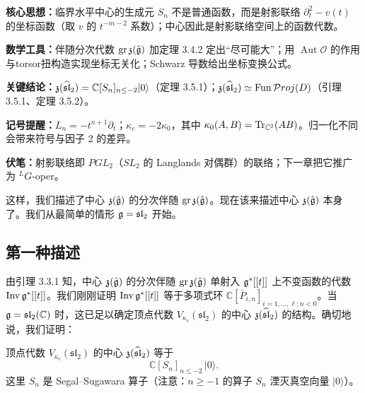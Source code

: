 \begin{keypoints}
    \item \textbf{核心思想：}临界水平中心的生成元 $S_n$ 不是普通函数，而是射影联络 $\partial_t^2-v(t)$ 的坐标函数（取 $v$ 的 $t^{-m-2}$ 系数）；中心因此是射影联络空间上的函数代数。
    \item \textbf{数学工具：}伴随分次代数 $\operatorname{gr}\mathfrak{z}(\hat{\mathfrak{g}})$ 加定理 3.4.2 定出“尽可能大”；用 $\operatorname{Aut}\mathcal{O}$ 的作用与torsor扭构造实现坐标无关化；Schwarz 导数给出坐标变换公式。
    \item \textbf{关键结论：}$\mathfrak{z}(\widehat{\mathfrak{sl}}_2)=\mathbb{C}[S_n]_{n\le-2}|0\rangle$（定理 3.5.1）；$\mathfrak{z}(\widehat{\mathfrak{sl}}_2)\simeq\operatorname{Fun}\mathcal{P}roj(D)$（引理 3.5.1、定理 3.5.2）。
    \item \textbf{记号提醒：}$L_n=-t^{n+1}\partial_t$；$\kappa_c=-2\kappa_0$，其中 $\kappa_0(A,B)=\operatorname{Tr}_{\mathbb{C}^2}(AB)$。归一化不同会带来符号与因子 2 的差异。
    \item \textbf{伏笔：}射影联络即 $PGL_2$（$SL_2$ 的 Langlands 对偶群）的联络；下一章把它推广为 $^LG$-oper。
\end{keypoints}

这样，我们描述了中心 $\mathfrak{z}(\hat{\mathfrak{g}})$ 的分次伴随 $\operatorname{gr}\mathfrak{z}(\hat{\mathfrak{g}})$。现在该来描述中心 $\mathfrak{z}(\hat{\mathfrak{g}})$ 本身了。我们从最简单的情形 $\mathfrak{g}=\mathfrak{sl}_2$ 开始。

\subsection{第一种描述}

由引理 3.3.1 知，中心 $\mathfrak{z}(\hat{\mathfrak{g}})$ 的分次伴随 $\operatorname{gr}\mathfrak{z}(\hat{\mathfrak{g}})$ 单射入 $\mathfrak{g}^*[[t]]$ 上不变函数的代数 $\operatorname{Inv}\mathfrak{g}^*[[t]]$。我们刚刚证明 $\operatorname{Inv}\mathfrak{g}^*[[t]]$ 等于多项式环 $\mathbb{C}[\bar P_{i,n}]_{i=1,\dots,\ell;n<0}$。当 $\mathfrak{g}=\mathfrak{sl}_2(\mathbb{C})$ 时，这已足以确定顶点代数 $V_{\kappa_c}(\mathfrak{sl}_2)$ 的中心 $\mathfrak{z}(\widehat{\mathfrak{sl}}_2)$ 的结构。确切地说，我们证明：

\begin{theorem}
    顶点代数 $V_{\kappa_c}(\mathfrak{sl}_2)$ 的中心 $\mathfrak{z}(\widehat{\mathfrak{sl}}_2)$ 等于
    \[
        \mathbb{C}[S_n]_{n\le -2}\,|0\rangle .
    \]
    这里 $S_n$ 是 Segal–Sugawara 算子（注意：$n\ge -1$ 的算子 $S_n$ 湮灭真空向量 $|0\rangle$）。
\end{theorem}


